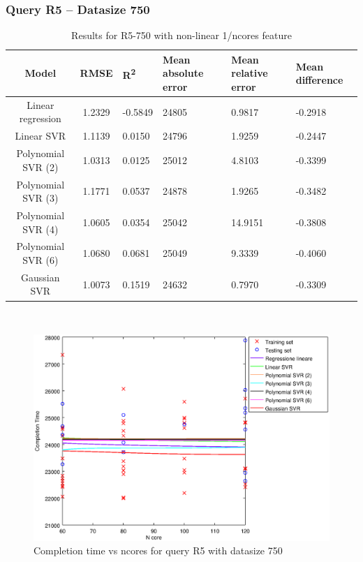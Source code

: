 \documentclass[a4paper,11pt]{article}
\begin{document}
\newpage
\subsubsection{Query R5 -- Datasize 750}
\begin{table}[H]
	\centering
	\begin{adjustbox}{center}
		\begin{tabular}{c | c M{1.2cm} M{2.5cm} M{2.5cm} M{1.8cm}}
			Model & RMSE & R\textsuperscript{2} & Mean absolute error & Mean relative error & Mean difference \tabularnewline
			\hline
			Linear regression & 1.2329 & -0.5849 &  24805 & 0.9817 & -0.2918 \\
			Linear SVR & 1.1139 & 0.0150 &  24796 & 1.9259 & -0.2447 \\
			Polynomial SVR (2) & 1.0313 & 0.0125 &  25012 & 4.8103 & -0.3399 \\
			Polynomial SVR (3) & 1.1771 & 0.0537 &  24878 & 1.9265 & -0.3482 \\
			Polynomial SVR (4) & 1.0605 & 0.0354 &  25042 & 14.9151 & -0.3808 \\
			Polynomial SVR (6) & 1.0680 & 0.0681 &  25049 & 9.3339 & -0.4060 \\
			Gaussian SVR & 1.0073 & 0.1519 &  24632 & 0.7970 & -0.3309 \\
		\end{tabular}
	\end{adjustbox}
	\\
	\caption{Results for R5-750 with non-linear 1/ncores feature}
	\label{table_R5_prediction_all}
\end{table}

\begin {figure}[hbtp]
\centering
\includegraphics[width=\textwidth]{output/R5_750_1_OVER_NCORES/plot_R5_750.eps}
\caption {Completion time vs ncores for query R5 with datasize 750}
\end {figure}
\end{document}
